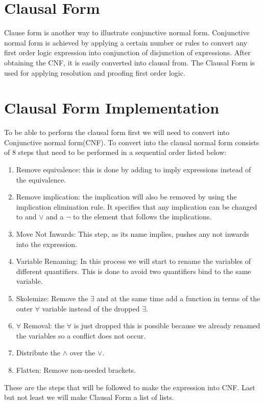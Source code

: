 {\section{Clausal Form}
Clause form is another way to illustrate conjunctive normal form. Conjunctive normal form is achieved by applying a certain number or rules to convert any first order logic expression into conjunction of disjunction of expressions. After obtaining the CNF, it is easily converted into clausal from. The Clausal Form is used for applying resolution and proofing first order logic.


\section{Clausal Form Implementation}
To be able to perform the clausal form first we will need to convert into Conjunctive normal form(CNF). To convert into the clausal normal form consists of 8 steps that need to be performed in a sequential order listed below:

\begin{enumerate}
\item{Remove equivalence: this is done by adding to imply expressions instead of the equivalence.}
\item{Remove implication: the implication will also be removed by using the implication elimination rule. It specifies that any implication can be changed to and $\vee$ and a $\neg$ to the element that follows the implications.}
\item{Move Not Inwards: This step, as its name implies, pushes any not inwards into the expression.}
\item{Variable Renaming: In this process we will start to rename the variables of different quantifiers. This is done to avoid two quantifiers bind to the same variable.}
\item{Skolemize: Remove the $\exists$ and at the same time add a function in terms of the outer $\forall$ variable instead of the dropped $\exists$.}
\item{$\forall$ Removal: the $\forall$ is just dropped this is possible because we already renamed the variables so a conflict does not occur.}
\item{Distribute the $\wedge$ over the $\vee$.}
\item{Flatten: Remove non-needed brackets.}
\end{enumerate}
These are the steps that will be followed to make the expression into CNF. Last but not least we will make Clausal Form a list of lists.
}
